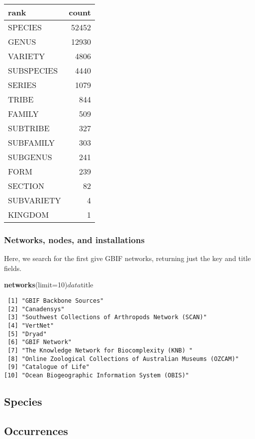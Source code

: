 \documentclass[author-year, review, 11pt]{components/elsarticle} %
\newenvironment{Shaded}{\begin{snugshade}}{\end{snugshade}}
\newcommand{\KeywordTok}[1]{\textcolor[rgb]{0.13,0.29,0.53}{\textbf{{#1}}}}
\newcommand{\DataTypeTok}[1]{\textcolor[rgb]{0.13,0.29,0.53}{{#1}}}
\newcommand{\DecValTok}[1]{\textcolor[rgb]{0.00,0.00,0.81}{{#1}}}
\newcommand{\NormalTok}[1]{{#1}}
\begin{document}
\begin{longtable}[c]{@{}lr@{}}
\toprule
rank & count\tabularnewline
\midrule
\endhead
SPECIES & 52452\tabularnewline
GENUS & 12930\tabularnewline
VARIETY & 4806\tabularnewline
SUBSPECIES & 4440\tabularnewline
SERIES & 1079\tabularnewline
TRIBE & 844\tabularnewline
FAMILY & 509\tabularnewline
SUBTRIBE & 327\tabularnewline
SUBFAMILY & 303\tabularnewline
SUBGENUS & 241\tabularnewline
FORM & 239\tabularnewline
SECTION & 82\tabularnewline
SUBVARIETY & 4\tabularnewline
KINGDOM & 1\tabularnewline
\bottomrule
\end{longtable}

\subsubsection{Networks, nodes, and
installations}\label{networks-nodes-and-installations}

Here, we search for the first give GBIF networks, returning just the key
and title fields.

\begin{Shaded}
\begin{Highlighting}[]
\KeywordTok{networks}\NormalTok{(}\DataTypeTok{limit=}\DecValTok{10}\NormalTok{)$data$title}
\end{Highlighting}
\end{Shaded}

\begin{verbatim}
 [1] "GBIF Backbone Sources"                                      
 [2] "Canadensys"                                                 
 [3] "Southwest Collections of Arthropods Network (SCAN)"         
 [4] "VertNet"                                                    
 [5] "Dryad"                                                      
 [6] "GBIF Network"                                               
 [7] "The Knowledge Network for Biocomplexity (KNB) "             
 [8] "Online Zoological Collections of Australian Museums (OZCAM)"
 [9] "Catalogue of Life"                                          
[10] "Ocean Biogeographic Information System (OBIS)"              
\end{verbatim}

\subsection{Species}\label{species}

\subsection{Occurrences}\label{occurrences}
\end{document}
